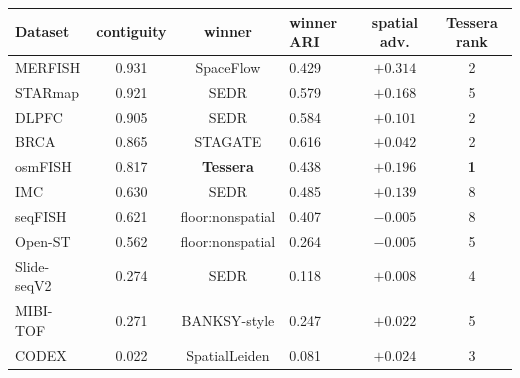 \begin{tabular}{lcclcc}
\toprule
Dataset & contiguity & winner & winner ARI & spatial adv. & Tessera rank\\
\midrule
MERFISH & 0.931 & SpaceFlow & 0.429 & $+0.314$ & 2\\
STARmap & 0.921 & SEDR & 0.579 & $+0.168$ & 5\\
DLPFC & 0.905 & SEDR & 0.584 & $+0.101$ & 2\\
BRCA & 0.865 & STAGATE & 0.616 & $+0.042$ & 2\\
osmFISH & 0.817 & \textbf{Tessera} & 0.438 & $+0.196$ & \textbf{1}\\
IMC & 0.630 & SEDR & 0.485 & $+0.139$ & 8\\
seqFISH & 0.621 & floor:nonspatial & 0.407 & $-0.005$ & 8\\
Open-ST & 0.562 & floor:nonspatial & 0.264 & $-0.005$ & 5\\
Slide-seqV2 & 0.274 & SEDR & 0.118 & $+0.008$ & 4\\
MIBI-TOF & 0.271 & BANKSY-style & 0.247 & $+0.022$ & 5\\
CODEX & 0.022 & SpatialLeiden & 0.081 & $+0.024$ & 3\\
\bottomrule
\end{tabular}
